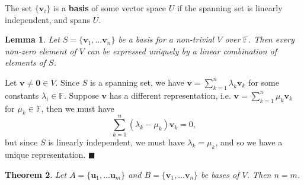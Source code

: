 \documentclass[letter-paper]{tufte-book}
\newtheorem{theorem}{\color{pastel-blue}Theorem}[section]
\newtheorem{lemma}[theorem]{\color{pastel-blue}Lemma}
\newenvironment{proof}[1][Proof]{\begin{trivlist}
\item[\hskip \labelsep {\bfseries #1}]}{\end{trivlist}}
\newcommand{\ub}{{\boldsymbol{u}}}
\newcommand{\vb}{{\boldsymbol{v}}}
\newcommand{\qed}{\hfill$\blacksquare$}
\begin{document}
The set $\{\vb_i\}$ is a \textbf{basis} of some vector space $U$ if the spanning
set is linearly independent, and spans $U$.

\begin{lemma}
  Let $S = \{\vb_1, \ldots \vb_n\}$ be a basis for a non-trivial $V$ over
  $\mathbb{F}$. Then every non-zero element of $V$ can be expressed
  \emph{uniquely} by a linear combination of elements of $S$.
\end{lemma}

\begin{proof}
  Let $\vb \neq \boldsymbol{0} \in V$. Since $S$ is a spanning set, we have $\vb
  = \sum_{k=1}^n \lambda_k \vb_k$ for some constants $\lambda_i \in \mathbb{F}$.
  Suppose $\vb$ has a different representation, i.e. $\vb = \sum_{k=1}^n \mu_k
  \vb_k$ for $\mu_k \in \mathbb{F}$, then we must have
  \begin{equation*}
    \sum_{k=1}^n (\lambda_k - \mu_k)\vb_k = 0,
  \end{equation*}
  but since $S$ is linearly independent, we must have $\lambda_k = \mu_k$, and
  so we have a unique representation. \qed
\end{proof}

\begin{theorem}
  Let $A = \{\ub_1, \ldots \ub_m\}$ and $B = \{\vb_1, \ldots \vb_n\}$ be bases of
  $V$. Then $n=m$.
\end{theorem}
\end{document}
